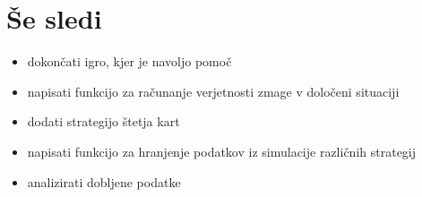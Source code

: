 \documentclass[a4paper, 16pt]{article}
\begin{document}

\section{Še sledi}
\begin{itemize}
\item dokončati igro, kjer je navoljo pomoč
\item napisati funkcijo za računanje verjetnosti zmage v določeni situaciji
 \item dodati strategijo štetja kart
\item napisati funkcijo za hranjenje podatkov iz simulacije različnih strategij
\item analizirati dobljene podatke
\end{itemize}
\end{document}
